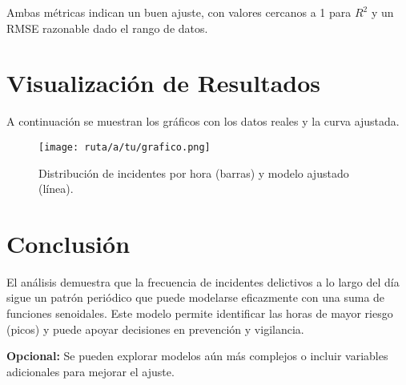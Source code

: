 \documentclass[a4paper,12pt]{article}
\begin{document}
Ambas métricas indican un buen ajuste, con valores cercanos a 1 para \( R^2 \) y un RMSE razonable dado el rango de datos.

\section{Visualización de Resultados}

A continuación se muestran los gráficos con los datos reales y la curva ajustada.

\begin{figure}[H]
    \centering
    \texttt{[image: ruta/a/tu/grafico.png]}
    \caption{Distribución de incidentes por hora (barras) y modelo ajustado (línea).}
\end{figure}

\section{Conclusión}

El análisis demuestra que la frecuencia de incidentes delictivos a lo largo del día sigue un patrón periódico que puede modelarse eficazmente con una suma de funciones senoidales. Este modelo permite identificar las horas de mayor riesgo (picos) y puede apoyar decisiones en prevención y vigilancia.

\vspace{1em}
\textbf{Opcional:} Se pueden explorar modelos aún más complejos o incluir variables adicionales para mejorar el ajuste.
\end{document}
